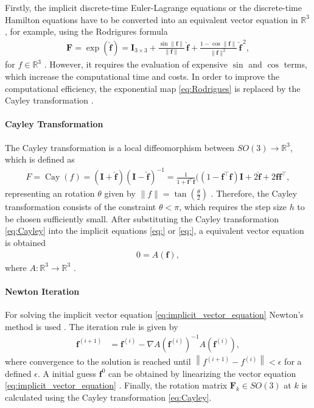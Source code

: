Firstly, the implicit discrete-time Euler-Lagrange equations or the discrete-time Hamilton equations have to be converted into an equivalent vector equation in $\mathbb{R}^3$, for example, using the Rodrigures formula
\begin{align}\label{eq:Rodrigues}
\bm{F}
=
\exp(\hat{\bm{f}})
=
\bm{I}_{3 \times 3}
+
\frac{\sin \lVert \bm{f} \rVert}{\lVert \bm{f} \rVert}\,\hat{\bm{f}}
+
\frac{1-\cos \lVert \bm{f} \rVert}{\lVert \bm{f} \rVert^2}\,\hat{\bm{f}}^{\,2},
\end{align}
for $f \in \mathbb{R}^3$ \cite{MarsdenRatiu1999}. However, it requires the evaluation of expensive $\sin$ and $\cos$ terms, which increase the computational time and costs. In order to improve the computational efficiency, the exponential map \eqref{eq:Rodrigues} is replaced by the Cayley transformation \cite{Arieh_Cayley_Motivation}.


\paragraph{Cayley Transformation}

The Cayley transformation is a local diffeomorphism between $SO(3) \to \mathbb{R}^3$, which is defined as 
\begin{align} \label{eq:Cayley}
    F= \operatorname{Cay}(f) = (\bm{I} + \hat{\bm{f}})(\bm{I}-\hat{\bm{f}})^{-1} = \frac{1}{1+\bm{f}^\top \bm{f}}((1-\bm{f}^\top \bm{f}) \bm{I}+2\hat{\bm{f}}+2\bm{f}\bm{f}^\top,
\end{align}
representing an rotation $\theta$ given by $\lVert f \rVert = \tan\left(\frac{\theta}{2}\right)$ \cite{Barbero-Linan2023_Cayley_Formula}. Therefore, the Cayley transformation consists of the constraint $\theta < \pi$, which requires the step size $h$ to be chosen sufficiently small. After substituting the Cayley transformation \eqref{eq:Cayley} into the implicit equations \eqref{eq:} or \eqref{eq:}, a equivalent vector equation is obtained
\begin{align}\label{eq:implicit_vector_equation}
     0 = A(\bm{f}),
\end{align}
 where $A:\mathbb{R}^3 \to \mathbb{R}^3$ \cite{ColomboJimenez2012SO3_Cayley}.

\paragraph{Newton Iteration}

For solving the implicit vector equation \eqref{eq:implicit_vector_equation} Newton's method is used \cite{Marsden2001}. The iteration rule is given by 
\begin{align}
\bm{f }^{(i+1)} &= \bm{f}^{(i)} - \nabla A\!\left(\bm{f}^{(i)}\right)^{-1} A\!\left(\bm{f}^{(i)}\right),
\end{align}
where convergence to the solution is reached until $\left\lVert f^{(i+1)} - f^{(i)} \right\rVert < \epsilon$ for a defined $\epsilon$. A initial guess $\bm{f}^0$ can be obtained by linearizing the vector equation \eqref{eq:implicit_vector_equation} \cite{Lee2008}. Finally, the rotation matrix $\bm{F}_k \in SO(3)$ at $k$ is calculated using the Cayley transformation \eqref{eq:Cayley}. 

